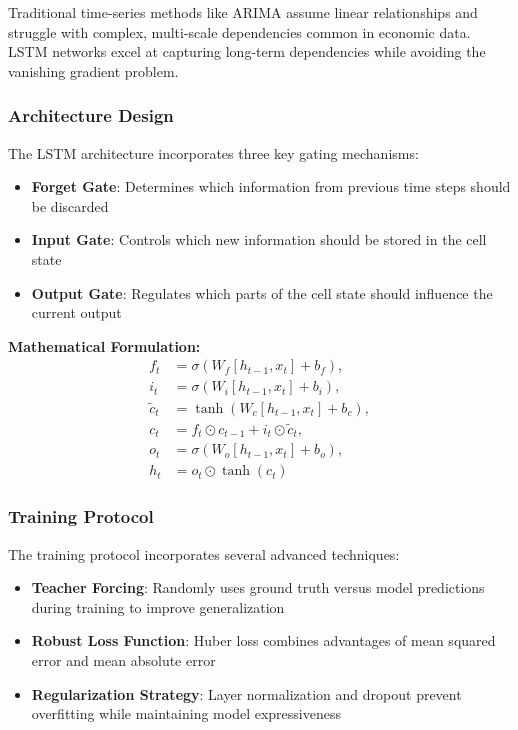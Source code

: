 Traditional time-series methods like ARIMA assume linear relationships and struggle with complex, multi-scale dependencies common in economic data. LSTM networks excel at capturing long-term dependencies while avoiding the vanishing gradient problem.

\subsubsection{Architecture Design}
The LSTM architecture incorporates three key gating mechanisms:
\begin{itemize}
    \item \textbf{Forget Gate}: Determines which information from previous time steps should be discarded
    \item \textbf{Input Gate}: Controls which new information should be stored in the cell state
    \item \textbf{Output Gate}: Regulates which parts of the cell state should influence the current output
\end{itemize}

\textbf{Mathematical Formulation:}
\begin{align}
  f_t &= \sigma(W_f [h_{t-1}, x_t] + b_f), \\
  i_t &= \sigma(W_i [h_{t-1}, x_t] + b_i), \\
  \tilde{c}_t &= \tanh(W_c [h_{t-1}, x_t] + b_c), \\
  c_t &= f_t \odot c_{t-1} + i_t \odot \tilde{c}_t, \\
  o_t &= \sigma(W_o [h_{t-1}, x_t] + b_o), \\
  h_t &= o_t \odot \tanh(c_t)
\end{align}

\subsubsection{Training Protocol}
The training protocol incorporates several advanced techniques:
\begin{itemize}
    \item \textbf{Teacher Forcing}: Randomly uses ground truth versus model predictions during training to improve generalization
    \item \textbf{Robust Loss Function}: Huber loss combines advantages of mean squared error and mean absolute error
    \item \textbf{Regularization Strategy}: Layer normalization and dropout prevent overfitting while maintaining model expressiveness
\end{itemize}


